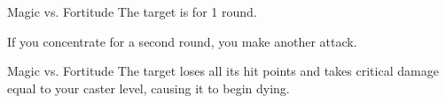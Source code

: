 \begin{spellheader}
    \begin{spelltargetinginfo}
    \end{spelltargetinginfo}
    \begin{spelleffects}
        \begin{spelltargetinginfo}
        \end{spelltargetinginfo}
    \end{spelleffects}
\end{spellheader}
\begin{spellcontent}
    \begin{spellattack}{Magic vs. Fortitude}
        \spellsuccess The target is \staggered for 1 round.
    \end{spellattack}
    \spellspecial If you concentrate for a second round, you make another attack.
    \begin{spellattack}{Magic vs. Fortitude}
        \spellsuccess The target loses all its hit points and takes critical damage equal to your caster level, causing it to begin dying.
    \end{spellattack}
\end{spellcontent}
\begin{spellfooter}

\end{spellfooter}

